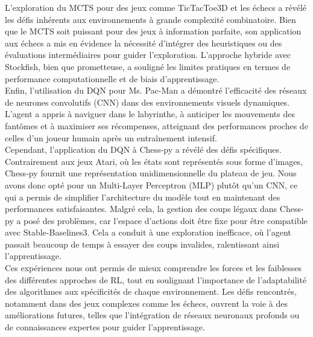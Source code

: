 \documentclass{article}
\begin{document}
L'exploration du MCTS pour des jeux comme TicTacToe3D et les échecs a révélé les défis inhérents aux environnements à grande complexité combinatoire. Bien que le MCTS soit puissant pour des jeux à information parfaite, son application aux échecs a mis en évidence la nécessité d'intégrer des heuristiques ou des évaluations intermédiaires pour guider l'exploration. L'approche hybride avec Stockfish, bien que prometteuse, a souligné les limites pratiques en termes de performance computationnelle et de biais d'apprentissage.\\

Enfin, l'utilisation du DQN pour Ms. Pac-Man a démontré l'efficacité des réseaux de neurones convolutifs (CNN) dans des environnements visuels dynamiques. L'agent a appris à naviguer dans le labyrinthe, à anticiper les mouvements des fantômes et à maximiser ses récompenses, atteignant des performances proches de celles d'un joueur humain après un entraînement intensif.\\

Cependant, l'application du DQN à Chess-py a révélé des défis spécifiques. Contrairement aux jeux Atari, où les états sont représentés sous forme d'images, Chess-py fournit une représentation unidimensionnelle du plateau de jeu. Nous avons donc opté pour un Multi-Layer Perceptron (MLP) plutôt qu'un CNN, ce qui a permis de simplifier l'architecture du modèle tout en maintenant des performances satisfaisantes. Malgré cela, la gestion des coups légaux dans Chess-py a posé des problèmes, car l'espace d'actions doit être fixe pour être compatible avec Stable-Baselines3. Cela a conduit à une exploration inefficace, où l'agent passait beaucoup de temps à essayer des coups invalides, ralentissant ainsi l'apprentissage.\\

Ces expériences nous ont permis de mieux comprendre les forces et les faiblesses des différentes approches de RL, tout en soulignant l'importance de l'adaptabilité des algorithmes aux spécificités de chaque environnement. Les défis rencontrés, notamment dans des jeux complexes comme les échecs, ouvrent la voie à des améliorations futures, telles que l'intégration de réseaux neuronaux profonds ou de connaissances expertes pour guider l'apprentissage.
\end{document}
